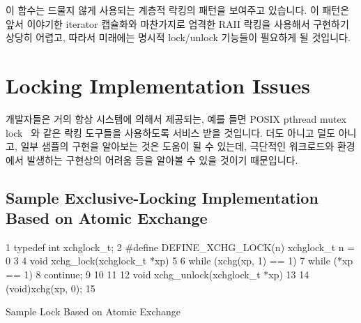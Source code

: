 이 함수는 드물지 않게 사용되는 계층적 락킹의 패턴을 보여주고 있습니다.
이 패턴은 앞서 이야기한 iterator 캡슐화와 마찬가지로 엄격한 RAII 락킹을
사용해서 구현하기 상당히 어렵고, 따라서 미래에는 명시적 lock/unlock 기능들이
필요하게 될 것입니다.

\section{Locking Implementation Issues}
\label{sec:locking:Locking Implementation Issues}

개발자들은 거의 항상 시스템에 의해서 제공되는, 예를 들면 POSIX pthread mutex
lock~\cite{OpenGroup1997pthreads,Butenhof1997pthreads} 와 같은 락킹 도구들을
사용하도록 서비스 받을 것입니다.
더도 아니고 덜도 아니고, 일부 샘플의 구현을 알아보는 것은 도움이 될 수 있는데,
극단적인 워크로드와 환경에서 발생하는 구현상의 어려움 등을 알아볼 수 있을
것이기 때문입니다.

\subsection{Sample Exclusive-Locking Implementation Based on Atomic Exchange}
\label{sec:locking:Sample Exclusive-Locking Implementation Based on Atomic Exchange}

\begin{listing}[tbp]
{ \scriptsize
\begin{verbbox}
  1 typedef int xchglock_t;
  2 #define DEFINE_XCHG_LOCK(n) xchglock_t n = 0
  3 
  4 void xchg_lock(xchglock_t *xp)
  5 {
  6   while (xchg(xp, 1) == 1) {
  7     while (*xp == 1)
  8       continue;
  9   }
 10 }
 11 
 12 void xchg_unlock(xchglock_t *xp)
 13 {
 14   (void)xchg(xp, 0);
 15 }
\end{verbbox}
}
\centering
\theverbbox
\caption{Sample Lock Based on Atomic Exchange}
\label{lst:locking:Sample Lock Based on Atomic Exchange}
\end{listing}

